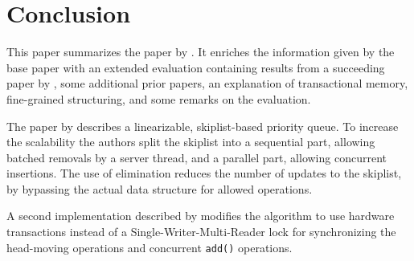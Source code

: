 
\section{Conclusion}

This paper summarizes the paper by \citeauthor{calciu_adaptive_2014}. It enriches the information given by the base paper with an extended evaluation containing results from a succeeding paper by \citeauthor{braginsky_cbpq:_2016}, some additional prior papers, an explanation of transactional memory, fine-grained structuring, and some remarks on the evaluation.

The paper by \citeauthor{calciu_adaptive_2014} describes a linearizable, skiplist-based priority queue. To increase the scalability the authors split the skiplist into a sequential part, allowing batched removals by a server thread, and a parallel part, allowing concurrent insertions. The use of elimination reduces the number of updates to the skiplist, by bypassing the actual data structure for allowed operations.

A second implementation described by \citeauthor{calciu_adaptive_2014} modifies the algorithm to use hardware transactions instead of a Single-Writer-Multi-Reader lock for synchronizing the head-moving operations and concurrent \texttt{add()} operations.
